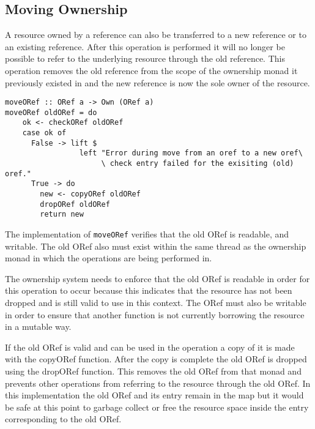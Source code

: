 \documentclass[onehalf,11pt]{beavtex}
\begin{document}
\subsection{Moving Ownership}

A resource owned by a reference can also be transferred to a new reference or
to an existing reference. After this operation is performed it will no longer
be possible to refer to the underlying resource through the old reference. This
operation removes the old reference from the scope of the ownership monad it
previously existed in and the new reference is now the sole owner of the
resource.

\begin{verbatim}
moveORef :: ORef a -> Own (ORef a)
moveORef oldORef = do
    ok <- checkORef oldORef
    case ok of
      False -> lift $ 
                 left "Error during move from an oref to a new oref\
                      \ check entry failed for the exisiting (old) oref."
      True -> do
        new <- copyORef oldORef
        dropORef oldORef
        return new
\end{verbatim}

The implementation of \texttt{moveORef} verifies that the old ORef is readable,
and writable. The old ORef also must exist within the same thread as the
ownership monad in which the operations are being performed in.

The ownership system needs to enforce that the old ORef is readable in order
for this operation to occur because this indicates that the resource has not
been dropped and is still valid to use in this context.
The ORef must also be writable in order to ensure that another function
is not currently borrowing the resource in a mutable way.

If the old ORef is valid and can be used in the operation a copy of it is made
with the copyORef function. After the copy is complete the old ORef is dropped
using the dropORef function. This removes the old ORef from that monad and
prevents other operations from referring to the resource through the old ORef.
In this implementation the old ORef and its entry remain in the map but
it would be safe at this point to garbage collect or free the resource space
inside the entry corresponding to the old ORef.

\end{document}
